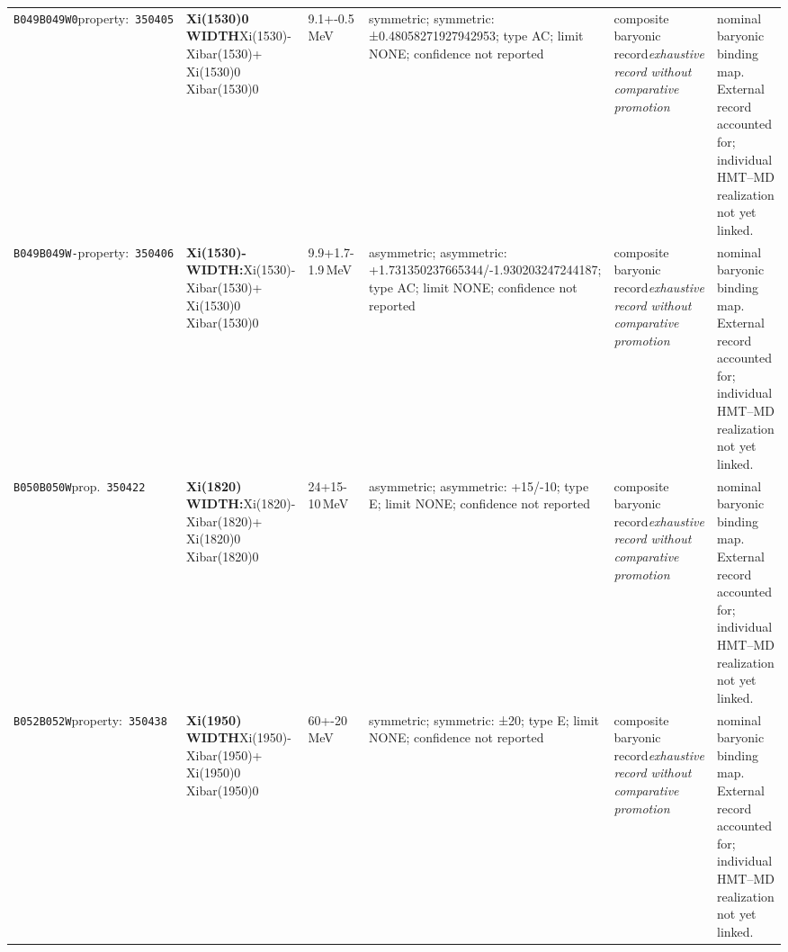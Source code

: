 \begin{landscape}
\begin{longtable}{L{1.85cm}L{4.45cm}L{2.35cm}L{4.05cm}L{3.35cm}L{7.15cm}}
\texttt{B049}\newline \texttt{B049W0}\newline property:\ \texttt{350405} & \textbf{Xi(1530)0 WIDTH}\newline Xi(1530)- \textbar{}\allowbreak{} Xibar(1530)+ \textbar{}\allowbreak{} Xi(1530)0 \textbar{}\allowbreak{} Xibar(1530)0 & 9.1+-0.5\,MeV & symmetric; symmetric: ±0.48058271927942953; type AC; limit NONE; confidence not reported & composite baryonic record\newline \emph{exhaustive record without comparative promotion} & nominal baryonic binding map. External record accounted for; individual HMT--MD realization not yet linked. \\
\texttt{B049}\newline \texttt{B049W-}\newline property:\ \texttt{350406} & \textbf{Xi(1530)- WIDTH:}\newline Xi(1530)- \textbar{}\allowbreak{} Xibar(1530)+ \textbar{}\allowbreak{} Xi(1530)0 \textbar{}\allowbreak{} Xibar(1530)0 & 9.9+1.7-1.9\,MeV & asymmetric; asymmetric: +1.731350237665344/-1.930203247244187; type AC; limit NONE; confidence not reported & composite baryonic record\newline \emph{exhaustive record without comparative promotion} & nominal baryonic binding map. External record accounted for; individual HMT--MD realization not yet linked. \\
\texttt{B050}\newline \texttt{B050W}\newline prop.\ \texttt{350422} & \textbf{Xi(1820) WIDTH:}\newline Xi(1820)- \textbar{}\allowbreak{} Xibar(1820)+ \textbar{}\allowbreak{} Xi(1820)0 \textbar{}\allowbreak{} Xibar(1820)0 & 24+15-10\,MeV & asymmetric; asymmetric: +15/-10; type E; limit NONE; confidence not reported & composite baryonic record\newline \emph{exhaustive record without comparative promotion} & nominal baryonic binding map. External record accounted for; individual HMT--MD realization not yet linked. \\
\texttt{B052}\newline \texttt{B052W}\newline property:\ \texttt{350438} & \textbf{Xi(1950) WIDTH}\newline Xi(1950)- \textbar{}\allowbreak{} Xibar(1950)+ \textbar{}\allowbreak{} Xi(1950)0 \textbar{}\allowbreak{} Xibar(1950)0 & 60+-20\,MeV & symmetric; symmetric: ±20; type E; limit NONE; confidence not reported & composite baryonic record\newline \emph{exhaustive record without comparative promotion} & nominal baryonic binding map. External record accounted for; individual HMT--MD realization not yet linked. \\

\end{longtable}
\end{landscape}
